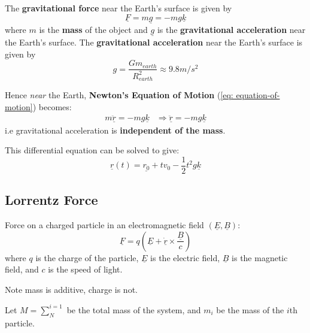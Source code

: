 \begin{definition}
	The {\bf gravitational force} near the Earth's surface is given by
	$$\underline{F} = m\underline{g} = -mg\underline{k}$$
	where $m$ is the {\bf mass} of the object and $\underline{g}$ is the {\bf gravitational acceleration} near the Earth's surface. The {\bf gravitational acceleration} near the Earth's surface is given by
	$$g = \frac{Gm_{earth}}{R^{2}_{earth}} \approx 9.8m/s^2 $$
\end{definition}
\begin{note}
	Hence {\em near} the Earth, {\bf Newton's Equation of Motion} (\ref{eq: equation-of-motion}) becomes:
	$$\begin{aligned} m\underline{\ddot{r}} = -mg\underline{k} &\Rightarrow \underline{\ddot{r}} = -mg\underline{k} \end{aligned}$$
	i.e gravitational acceleration is {\bf independent of the mass}.
\end{note}
This differential equation can be solved to give:
$$\underline{r}\left(t  \right) = \underline{r_0} + tv_0 - \frac{1}{2}t^2g\underline{k}$$

\subsection{Lorrentz Force}
\begin{definition}
	Force on a charged particle in an electromagnetic field $(\underline{E}, \underline{B})$:
	$$\underline{F} = q\left( \underline{E} + \underline{\dot{r}} \times \frac{\underline{B}}{c} \right) $$
	where $q$ is the charge of the particle, $\underline{E}$ is the electric field, $\underline{B}$ is the magnetic field, and $c$ is the speed of light.
\end{definition}

\begin{note}
	Note mass is additive, charge is not.
\end{note}

\begin{notation}
	Let $M = \sum^{i=1}_{N}$ be the total mass of the system, and $m_{i}$ be the mass of the $i$th particle.
\end{notation}
